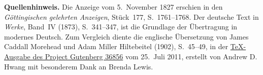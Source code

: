 \par\medskip\begin{small}\noindent\textbf{Quellenhinweis.} Die Anzeige vom 5.~November 1827 erschien in den \textit{Göttingischen gelehrten Anzeigen}, Stück~177, S.~1761--1768. Der deutsche Text in \textit{Werke}, Band~IV (1873), S.~341--347, ist die Grundlage der Übertragung in modernes Deutsch. Zum Vergleich diente die englische Übersetzung von James Caddall Morehead und Adam Miller Hiltebeitel (1902), S.~45--49, in der \href{https://www.gutenberg.org/ebooks/36856}{TeX-Ausgabe des Project Gutenberg 36856} vom 25.~Juli 2011, erstellt von Andrew D. Hwang mit besonderem Dank an Brenda Lewis.\par\end{small}
